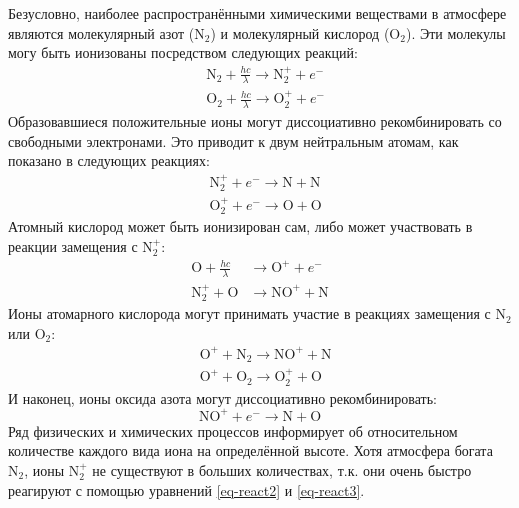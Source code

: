 Безусловно, наиболее распространёнными химическими веществами в атмосфере являются молекулярный азот ($\text{N}_2$) и молекулярный кислород ($\text{O}_2$).
Эти молекулы могу быть ионизованы посредством следующих реакций: 
\begin{equation}
\label{eq-react1}
\begin{aligned}
&\text{N}_2+\frac{hc}{\lambda}\rightarrow\text{N}_2^{+}+e^{-} \\
&\text{O}_2+\frac{hc}{\lambda}\rightarrow\text{O}_2^{+}+e^{-}     
\end{aligned}
\end{equation}
Образовавшиеся положительные ионы могут диссоциативно рекомбинировать со свободными электронами.
Это приводит к двум нейтральным атомам, как показано в следующих реакциях:
\begin{equation}
\label{eq-react2}
\begin{aligned}
&\text{N}_2^{+}+e^{-}\rightarrow\text{N}+\text{N} \\
&\text{O}_2^{+}+e^{-}\rightarrow\text{O}+\text{O} 
\end{aligned}
\end{equation}
Атомный кислород может быть ионизирован сам, либо может участвовать в реакции замещения с $\text{N}_2^{+}$: 
\begin{equation}
\begin{aligned}
\label{eq-react3}
\text{O}+\frac{hc}{\lambda}&\rightarrow\text{O}^{+}+e^{-} \\
\text{N}_2^{+}+\text{O}&\rightarrow\text{NO}^{+}+\text{N}  
\end{aligned}
\end{equation}
Ионы атомарного кислорода могут принимать участие в реакциях замещения с $\text{N}_2$ или $\text{O}_2$:
\begin{equation}
\label{eq-react4}
\begin{aligned}
&\text{O}^{+}+\text{N}_2\rightarrow\text{NO}^{+}+\text{N} \\
&\text{O}^{+}+\text{O}_2\rightarrow\text{O}_2^{+}+\text{O} 
\end{aligned}
\end{equation}
И наконец, ионы оксида азота могут диссоциативно рекомбинировать:
\begin{equation}
\label{eq-react5}
\text{NO}^{+}+e^{-}\rightarrow\text{N}+\text{O}
\end{equation}
Ряд физических и химических процессов информирует об относительном количестве каждого вида иона на определённой высоте.
Хотя атмосфера богата $\text{N}_2$, ионы $\text{N}_2^{+}$ не существуют в больших количествах, т.к. они очень быстро реагируют с помощью уравнений \eqref{eq-react2} и \eqref{eq-react3}. 
